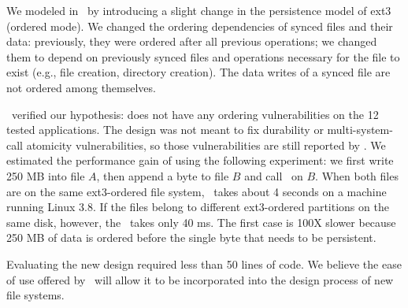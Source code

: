 We modeled  in \toolname\ by introducing a slight change in the
persistence model of ext3 (ordered mode). We changed the ordering dependencies
of synced files and their data: previously, they were ordered after all
previous operations; we changed them to depend on previously synced files and
operations necessary for the file to exist (e.g., file creation, directory
creation). The data writes of a synced file are not ordered among themselves.

\toolname\ verified our hypothesis:  does not have any
ordering vulnerabilities on the 12 tested applications. The design was not
meant to fix durability or multi-system-call atomicity vulnerabilities, so
those vulnerabilities are still reported by \toolname.  We estimated the
performance gain of  using the following experiment: we
first write 250 MB into file $A$, then append a byte to file $B$ and call
\fsyncSC\ on $B$. When both files are on the same ext3-ordered file system,
\fsyncSC\ takes about 4 seconds on a machine running Linux 3.8.  If the
files belong to different ext3-ordered partitions on the same disk, however,
the \fsyncSC\ takes only 40 ms. The first case is 100X slower because 250
MB of data is ordered before the single byte that needs to be persistent.

Evaluating the new design required less than 50 lines of code. We believe the
ease of use offered by \toolname\ will allow it to be incorporated into the
design process of new file systems. 
